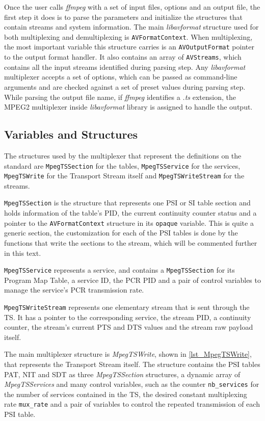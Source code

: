 \documentclass[
	12pt,				%
	openright,			%
	twoside,			%
	a4paper,			%
	brazil,
	french,				%
	english
	]{abntex2}
\begin{document}
Once the user calls \textit{ffmpeg} with a set of input files, options and an output file, the first step it does is to parse the parameters and initialize the structures that contain streams and system information. The main \textit{libavformat} structure used for both multiplexing and demultiplexing is \texttt{AVFormatContext}. When multiplexing, the most important variable this structure carries is an \texttt{AVOutputFormat} pointer to the output format handler. It also contains an array of \texttt{AVStreams}, which contains all the input streams identified during parsing step. Any \textit{libavformat} multiplexer accepts a set of options, which can be passed as command-line arguments and are checked against a set of preset values during parsing step. While parsing the output file name, if \textit{ffmpeg} identifies a \textit{.ts} extension, the MPEG2 multiplexer inside \textit{libavformat} library is assigned to handle the output.

\subsection{Variables and Structures}

The structures used by the multiplexer that represent the definitions on the standard are \texttt{MpegTSSection} for the tables, \texttt{MpegTSService} for the services, \texttt{MpegTSWrite} for the Transport Stream itself and \texttt{MpegTSWriteStream} for the streams.

\texttt{MpegTSSection} is the structure that represents one PSI or SI table section and holds information of the table's PID, the current continuity counter status and a pointer to the \texttt{AVFormatContext} structure in its \texttt{opaque} variable. This is quite a generic section, the customization for each of the PSI tables is done by the functions that write the sections to the stream, which will be commented further in this text.

\texttt{MpegTSService} represents a service, and contains a \texttt{MpegTSSection} for its Program Map Table, a service ID, the PCR PID and a pair of control variables to manage the service's PCR transmission rate.

\texttt{MpegTSWriteStream} represents one elementary stream that is sent through the TS. It has a pointer to the corresponding service, the stream PID, a continuity counter, the stream's current PTS and DTS values and the stream raw payload itself.

The main multiplexer structure is \textit{MpegTSWrite}, shown in \autoref{lst_MpegTSWrite}, that represents the Transport Stream itself. The structure contains the PSI tables PAT, NIT and SDT as three \textit{MpegTSSection} structures, a dynamic array of \textit{MpegTSServices} and many control variables, such as the counter \texttt{nb\_services} for the number of services contained in the TS, the desired constant multiplexing rate \texttt{mux\_rate} and a pair of variables to control the repeated transmission of each PSI table.
\end{document}
